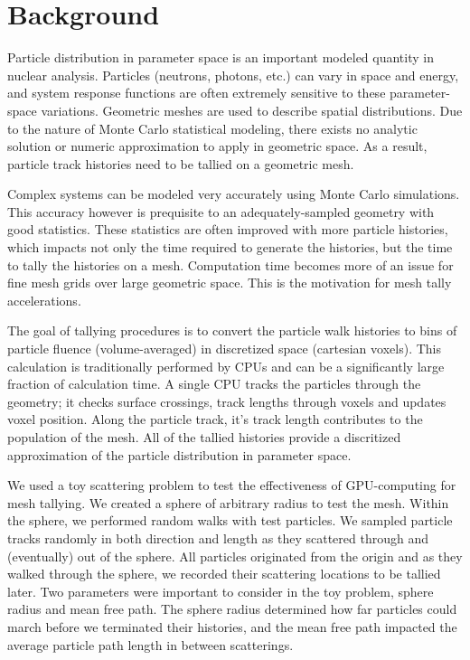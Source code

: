 
\section{Background}
Particle distribution in parameter space is an important modeled quantity in
nuclear analysis. Particles (neutrons, photons, etc.) can vary in space and
energy, and system response functions are often extremely sensitive to these
parameter-space variations. Geometric meshes are used to describe spatial
distributions. Due to the nature of Monte Carlo statistical modeling, there
exists no analytic solution or numeric approximation to apply in geometric
space. As a result, particle track histories need to be tallied on a geometric
mesh.

Complex systems can be modeled very accurately using Monte Carlo simulations.
This accuracy however is prequisite to an adequately-sampled geometry
with good statistics. These statistics are often improved with more particle
histories, which impacts not only the time required to generate the histories,
but the time to tally the histories on a mesh. Computation time becomes more of
an issue for fine mesh grids over large geometric space. This is the motivation for mesh
tally accelerations.

The goal of tallying procedures is to convert the particle walk histories
to bins of particle fluence (volume-averaged) in discretized space (cartesian
voxels). This calculation is traditionally performed by CPUs and can be a
significantly large fraction of calculation time.
A single CPU tracks the particles through the
geometry; it checks surface crossings, track lengths through voxels and updates
voxel position. Along the particle track, it's track length contributes to the
population of the mesh. All of the tallied histories provide a discritized
approximation of the particle distribution in parameter space.

We used a toy scattering problem to test the effectiveness of GPU-computing for
mesh tallying. We created a sphere of arbitrary radius to test the mesh. Within
the sphere, we performed random walks with test particles. We sampled particle
tracks randomly in both direction and length as they scattered through and
(eventually) out of the sphere. All particles originated from the origin and
as they  walked through
the sphere, we recorded their scattering locations to be tallied later. Two
parameters were important to consider in the toy problem, sphere radius and mean
free path. The sphere radius determined how far particles could march before we
terminated their histories, and the mean free path impacted the average particle
path length in between scatterings.
